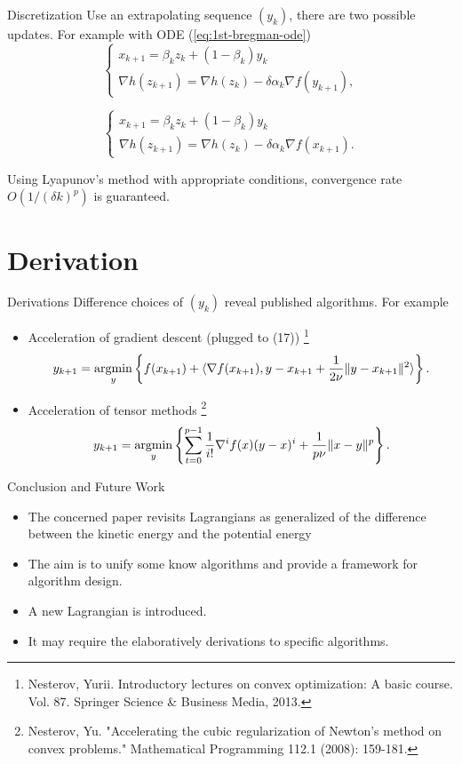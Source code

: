 \begin{frame}{Discretization}
  Use an extrapolating sequence $(y_k)$, there are two possible updates. For example with ODE (\ref{eq:1st-bregman-ode})
  \begin{equation}
    \begin{cases}
      x_{k+1} = \beta_kz_k + (1-\beta_k)y_k \\
      \nabla h(z_{k+1}) = \nabla h(z_{k}) - \delta\alpha_k \nabla f(y_{k+1}),
    \end{cases}
  \end{equation}

  \begin{equation}
    \begin{cases}
      x_{k+1} = \beta_kz_k + (1-\beta_k)y_k \\
      \nabla h(z_{k+1}) = \nabla h(z_{k}) - \delta\alpha_k \nabla f(x_{k+1}).
    \end{cases}
  \end{equation}

  Using Lyapunov's method with appropriate conditions, convergence rate $O(1/(\delta k)^p)$ is guaranteed.
\end{frame}

\section{Derivation}

\begin{frame}{Derivations}
  Difference choices of $(y_k)$ reveal published algorithms. For example
  \begin{itemize}
    \item Acceleration of gradient descent (plugged to (17)) \footnote{Nesterov, Yurii. Introductory lectures on convex optimization: A basic course. Vol. 87. Springer Science \& Business Media, 2013.}
          $$y_{k+1} = \operatorname*{argmin}\limits_{y}\left\{f(x_{k+1}) + \langle \nabla f(x_{k+1}), y - x_{k+1} + \dfrac{1}{2\nu}\|y-x_{k+1}\|^2\rangle\right\}.$$
    \item Acceleration of tensor methods \footnote{Nesterov, Yu. "Accelerating the cubic regularization of Newton’s method on convex problems." Mathematical Programming 112.1 (2008): 159-181.}
          $$y_{k+1} = \operatorname*{argmin}\limits_{y}\left\{\sum\limits_{t=0}^{p-1}\dfrac{1}{i!}\nabla^i f(x)(y-x)^{i} + \dfrac{1}{p\nu}\|x-y\|^p\right\}.$$
  \end{itemize}
\end{frame}

\begin{frame}{Conclusion and Future Work}
  \begin{itemize}
    \item The concerned paper revisits Lagrangians as generalized of the difference between the kinetic energy and the potential energy
    \item  The aim is to unify some know algorithms and provide a framework for algorithm design.
    \item A new Lagrangian is introduced.
    \item It may require the elaboratively derivations to specific algorithms.
  \end{itemize}
\end{frame}